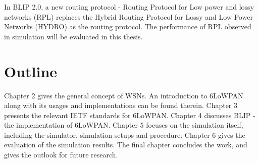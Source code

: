In BLIP 2.0, a new routing protocol - Routing Protocol for Low power and lossy networks (RPL) replaces the Hybrid Routing Protocol for Lossy and Low Power Networks (HYDRO) as the routing protocol. The performance of RPL observed in simulation will be evaluated in this thesis.
\section{Outline}
\label{Intr:Outline}

Chapter 2 gives the general concept of WSNs. An introduction to 6LoWPAN along with its usages and implementations can be found therein. Chapter 3 presents the relevant IETF standards for 6LoWPAN. Chapter 4 discusses BLIP - the implementation of 6LoWPAN. Chapter 5 focuses on the simulation itself,  including the simulator, simulation setups and procedure. Chapter 6 gives the evaluation of the simulation results. The final chapter concludes the work, and gives the outlook for future research.
